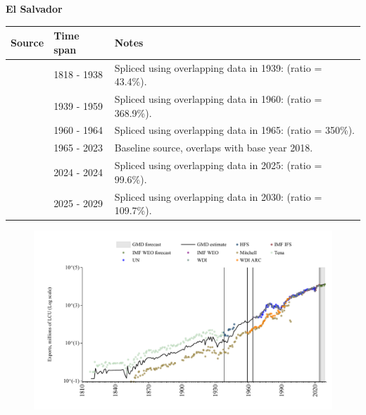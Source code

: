 \documentclass[12pt,a4paper,landscape]{article}
\begin{document}
\begin{adjustbox}{max totalsize={\paperwidth}{\paperheight},center}
\begin{minipage}[t][\textheight][t]{\textwidth}
\vspace*{0.5cm}
{}
\begin{center}
{\Large\bfseries El Salvador}
\end{center}
\vspace{0.5cm}
\begin{table}[H]
\centering
\small
\begin{tabular}{|l|l|l|}
\hline
\textbf{Source} & \textbf{Time span} & \textbf{Notes} \\
\hline
\rowcolor{white}\cite{Tena}& 1818 - 1938 &Spliced using overlapping data in 1939: (ratio = 43.4\%).\\
\rowcolor{lightgray}\cite{Mitchell}& 1939 - 1959 &Spliced using overlapping data in 1960: (ratio = 368.9\%).\\
\rowcolor{white}\cite{WDI_ARC}& 1960 - 1964 &Spliced using overlapping data in 1965: (ratio = 350\%).\\
\rowcolor{lightgray}\cite{WDI}& 1965 - 2023 &Baseline source, overlaps with base year 2018.\\
\rowcolor{white}\cite{IMF_IFS}& 2024 - 2024 &Spliced using overlapping data in 2025: (ratio = 99.6\%).\\
\rowcolor{lightgray}\cite{IMF_WEO_forecast}& 2025 - 2029 &Spliced using overlapping data in 2030: (ratio = 109.7\%).\\
\hline
\end{tabular}
\end{table}
\begin{figure}[H]
\centering
\includegraphics[width=\textwidth,height=0.6\textheight,keepaspectratio]{graphs/SLV_exports.pdf}
\end{figure}
\end{minipage}
\end{adjustbox}
\end{document}
